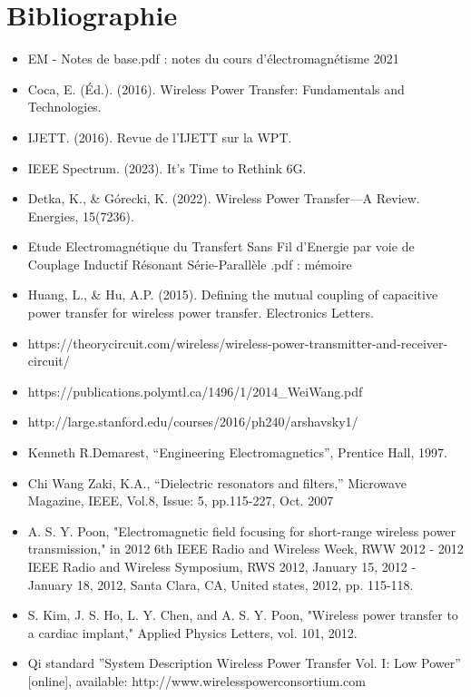 \documentclass[12pt,a4paper,titlepage,notitlepage]{article}
\begin{document}
	\section*{Bibliographie}
	\vspace{1cm}
	\begin{itemize}
		\item EM - Notes de base.pdf : notes du cours d'électromagnétisme 2021
		\item Coca, E. (Éd.). (2016). Wireless Power Transfer: Fundamentals and Technologies.
		\item IJETT. (2016). Revue de l'IJETT sur la WPT.
		\item IEEE Spectrum. (2023). It’s Time to Rethink 6G.
		\item Detka, K., \& Górecki, K. (2022). Wireless Power Transfer—A Review. Energies, 15(7236).
		\item Etude Electromagnétique du Transfert Sans Fil d’Energie par voie de Couplage Inductif Résonant Série-Parallèle .pdf : mémoire
		\item Huang, L., \& Hu, A.P. (2015). Defining the mutual coupling of capacitive power transfer for wireless power transfer. Electronics Letters.
		\item https://theorycircuit.com/wireless/wireless-power-transmitter-and-receiver-circuit/
		\item https://publications.polymtl.ca/1496/1/2014\_WeiWang.pdf
		\item http://large.stanford.edu/courses/2016/ph240/arshavsky1/
		\item Kenneth R.Demarest, “Engineering Electromagnetics”, Prentice Hall, 1997. 
		\item  Chi Wang Zaki, K.A., “Dielectric resonators and filters,” Microwave Magazine, IEEE, 
		Vol.8, Issue: 5, pp.115-227, Oct. 2007
		\item  A. S. Y. Poon, "Electromagnetic field focusing for short-range wireless power 
		transmission," in 2012 6th IEEE Radio and Wireless Week, RWW 2012 - 2012 IEEE 
		Radio and Wireless Symposium, RWS 2012, January 15, 2012 - January 18, 2012, Santa 
		Clara, CA, United states, 2012, pp. 115-118. 
		\item S. Kim, J. S. Ho, L. Y. Chen, and A. S. Y. Poon, "Wireless power transfer to a cardiac 
		implant," Applied Physics Letters, vol. 101, 2012. 
		\item Qi standard ”System Description Wireless Power Transfer Vol. I: Low Power” [online], 
		available: http://www.wirelesspowerconsortium.com 
		
			
	\end{itemize}
	
	
	
	
	
	
	
	
	
	
	
	
	
	
	
	
	
	
	
	
	
	
	
	
	
	
	
	
	
	
\end{document}
